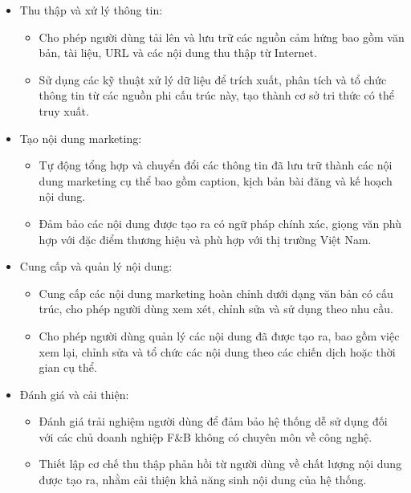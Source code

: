 \begin{itemize}
\item
  Thu thập và xử lý thông tin:

  \begin{itemize}
  \item
    Cho phép người dùng tải lên và lưu trữ các nguồn cảm hứng bao gồm
    văn bản, tài liệu, URL và các nội dung thu thập từ Internet.
  \item
    Sử dụng các kỹ thuật xử lý dữ liệu để trích xuất, phân tích và tổ
    chức thông tin từ các nguồn phi cấu trúc này, tạo thành cơ sở tri
    thức có thể truy xuất.
  \end{itemize}
\item
  Tạo nội dung marketing:

  \begin{itemize}
  \item
    Tự động tổng hợp và chuyển đổi các thông tin đã lưu trữ thành các
    nội dung marketing cụ thể bao gồm caption, kịch bản bài đăng và kế
    hoạch nội dung.
  \item
    Đảm bảo các nội dung được tạo ra có ngữ pháp chính xác, giọng văn
    phù hợp với đặc điểm thương hiệu và phù hợp với thị trường Việt Nam.
  \end{itemize}
\item
  Cung cấp và quản lý nội dung:

  \begin{itemize}
  \item
    Cung cấp các nội dung marketing hoàn chỉnh dưới dạng văn bản có cấu
    trúc, cho phép người dùng xem xét, chỉnh sửa và sử dụng theo nhu
    cầu.
  \item
    Cho phép người dùng quản lý các nội dung đã được tạo ra, bao gồm
    việc xem lại, chỉnh sửa và tổ chức các nội dung theo các chiến dịch
    hoặc thời gian cụ thể.
  \end{itemize}
\item
  Đánh giá và cải thiện:

  \begin{itemize}
  \item
    Đánh giá trải nghiệm người dùng để đảm bảo hệ thống dễ sử dụng đối
    với các chủ doanh nghiệp F\&B không có chuyên môn về công nghệ.
  \item
    Thiết lập cơ chế thu thập phản hồi từ người dùng về chất lượng nội
    dung được tạo ra, nhằm cải thiện khả năng sinh nội dung của hệ
    thống.
  \end{itemize}
\end{itemize}

